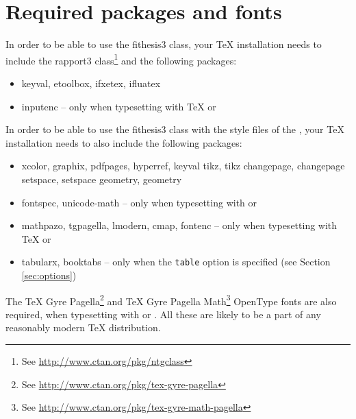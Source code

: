 \documentclass[color,table,cover,twoside,lot,lof]{../../fithesis3}
\begin{document}
  \section{Required packages and fonts}\label{sec:req-packages}
  In order to be able to use the \textsf{fithesis3} class, your
  \TeX{} installation needs to include the \textsf{rapport3}
  class\footnote{See
  \url{http://www.ctan.org/pkg/ntgclass}} and the following
  packages:\begin{itemize}
    \item\textsf{keyval}, \textsf{etoolbox}, \textsf{ifxetex},
      \textsf{ifluatex}
    \item\textsf{inputenc} -- only when typesetting with \TeX{} or
  \end{itemize} In order to be able to use the \textsf{fithesis3}
  class with the style files of the
  \makeatletter\thesis@english@facultyName\makeatother, your
  \TeX{} installation needs to also include the following
  packages:\begin{itemize}
    \item\textsf{xcolor}, \textsf{graphix}, \textsf{pdfpages},
      \textsf{hyperref}, \textsf{keyval}%
      {\makeatletter %
      \def\thguide@prnpkg#1{\ltx@ifpackageloaded%
        {#1}{, \textsf{#1}}{}}%
      \thguide@prnpkg{tikz}%
      \thguide@prnpkg{changepage}%
      \thguide@prnpkg{setspace}%
      \thguide@prnpkg{geometry}}
    \item\textsf{fontspec}, \textsf{unicode-math} -- only when
      typesetting with  or 
    \item\textsf{mathpazo}, \textsf{tgpagella}, \textsf{lmodern},
       \textsf{cmap}, \textsf{fontenc} -- only when typesetting
       with \TeX{} or 
    \item\textsf{tabularx}, \textsf{booktabs} -- only when the
      \texttt{table} option is specified (see Section
      \ref{sec:options})
  \end{itemize}
  The \TeX{} Gyre Pagella\footnote{See
  \url{http://www.ctan.org/pkg/tex-gyre-pagella}} and
  \TeX{} Gyre Pagella Math\footnote{See
  \url{http://www.ctan.org/pkg/tex-gyre-math-pagella}} OpenType
  fonts are also required, when typesetting with  or
  . All these are likely to be a part of any
  reasonably modern \TeX{} distribution.
\end{document}
